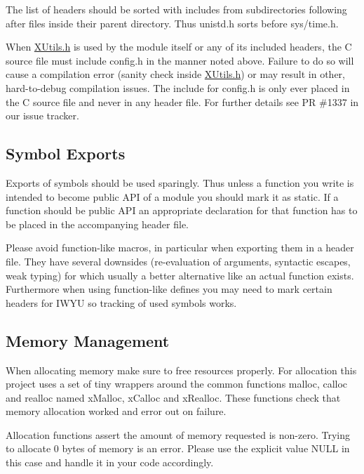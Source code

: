 The list of headers should be sorted with includes from subdirectories following after files inside their parent directory. Thus {\ttfamily unistd.\+h} sorts before {\ttfamily sys/time.\+h}.

When {\ttfamily \hyperlink{XUtils_8h}{X\+Utils.\+h}} is used by the module itself or any of its included headers, the C source file must include {\ttfamily config.\+h} in the manner noted above. Failure to do so will cause a compilation error (sanity check inside {\ttfamily \hyperlink{XUtils_8h}{X\+Utils.\+h}}) or may result in other, hard-\/to-\/debug compilation issues. The include for {\ttfamily config.\+h} is only ever placed in the C source file and never in any header file. For further details see PR \#1337 in our issue tracker.

\subsection*{Symbol Exports }

Exports of symbols should be used sparingly. Thus unless a function you write is intended to become public A\+PI of a module you should mark it as {\ttfamily static}. If a function should be public A\+PI an appropriate declaration for that function has to be placed in the accompanying header file.

Please avoid function-\/like macros, in particular when exporting them in a header file. They have several downsides (re-\/evaluation of arguments, syntactic escapes, weak typing) for which usually a better alternative like an actual function exists. Furthermore when using function-\/like {\ttfamily define}s you may need to mark certain headers for I\+W\+YU so tracking of used symbols works.

\subsection*{Memory Management }

When allocating memory make sure to free resources properly. For allocation this project uses a set of tiny wrappers around the common functions {\ttfamily malloc}, {\ttfamily calloc} and {\ttfamily realloc} named {\ttfamily x\+Malloc}, {\ttfamily x\+Calloc} and {\ttfamily x\+Realloc}. These functions check that memory allocation worked and error out on failure.

Allocation functions assert the amount of memory requested is non-\/zero. Trying to allocate 0 bytes of memory is an error. Please use the explicit value {\ttfamily N\+U\+LL} in this case and handle it in your code accordingly.

